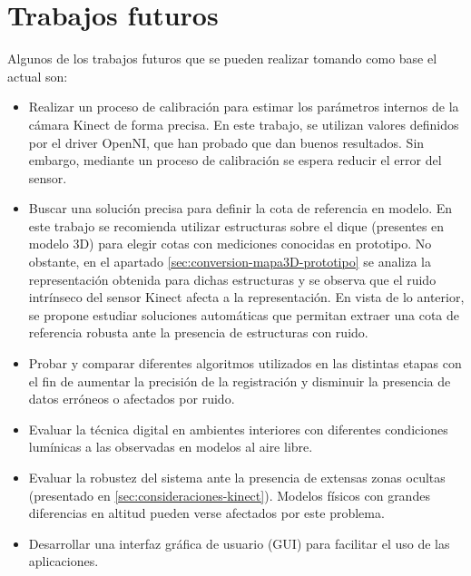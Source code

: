 \chapter{Trabajos futuros}

Algunos de los trabajos futuros que se pueden realizar tomando como base el actual son:

\begin{itemize}

\item Realizar un proceso de calibración para estimar los parámetros internos \cite{wiki-calibracion-camara} de la cámara Kinect de forma precisa. En este trabajo, se utilizan valores definidos por el driver OpenNI, que han probado que dan buenos resultados. Sin embargo, mediante un proceso de calibración se espera reducir el error del sensor.

\item Buscar una solución precisa para definir la cota de referencia en modelo. En este trabajo se recomienda utilizar estructuras sobre el dique (presentes en modelo 3D) para elegir cotas con mediciones conocidas en prototipo. No obstante, en el apartado \ref{sec:conversion-mapa3D-prototipo} se analiza la representación obtenida para dichas estructuras y se observa que el ruido intrínseco del sensor Kinect afecta a la representación. En vista de lo anterior, se propone estudiar soluciones automáticas que permitan extraer una cota de referencia robusta ante la presencia de estructuras con ruido.

\item Probar y comparar diferentes algoritmos utilizados en las distintas etapas con el fin de aumentar la precisión de la registración y disminuir la presencia de datos erróneos o afectados por ruido.

\item Evaluar la técnica digital en ambientes interiores con diferentes condiciones lumínicas a las observadas en modelos al aire libre. 

\item Evaluar la robustez del sistema ante la presencia de extensas zonas ocultas (presentado en \ref{sec:consideraciones-kinect}). Modelos físicos con grandes diferencias en altitud pueden verse afectados por este problema.

\item Desarrollar una interfaz gráfica de usuario (GUI) para facilitar el uso de las aplicaciones.

\end{itemize}